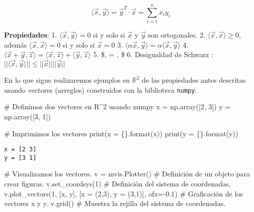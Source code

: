 \documentclass[
  letterpaper,
  DIV=11,
  numbers=noendperiod]{scrreprt}
\newenvironment{Shaded}{\begin{snugshade}}{\end{snugshade}}
\newcommand{\BuiltInTok}[1]{\textcolor[rgb]{0.00,0.23,0.31}{#1}}
\newcommand{\CommentTok}[1]{\textcolor[rgb]{0.37,0.37,0.37}{#1}}
\newcommand{\DecValTok}[1]{\textcolor[rgb]{0.68,0.00,0.00}{#1}}
\newcommand{\FloatTok}[1]{\textcolor[rgb]{0.68,0.00,0.00}{#1}}
\newcommand{\NormalTok}[1]{\textcolor[rgb]{0.00,0.23,0.31}{#1}}
\newcommand{\OperatorTok}[1]{\textcolor[rgb]{0.37,0.37,0.37}{#1}}
\newcommand{\SpecialCharTok}[1]{\textcolor[rgb]{0.37,0.37,0.37}{#1}}
\newcommand{\StringTok}[1]{\textcolor[rgb]{0.13,0.47,0.30}{#1}}
\begin{document}
\[
\langle \vec{x}, \vec{y} \rangle = \vec{y}^T \cdot \vec{x} = \sum_{i=1}^n x_i y_i \tag{1}
\]

\textbf{Propiedades}: 1. \(\langle \vec{x}, \vec{y} \rangle = 0\) si y
solo si \(\vec{x}\) y \(\vec{y}\) son ortogonales. 2.
\(\langle \vec{x}, \vec{x} \rangle \ge 0\), además
\(\langle \vec{x}, \vec{x} \rangle = 0\) si y solo si \(\vec{x} = 0\) 3.
\(\langle \alpha \vec{x}, \vec{y} \rangle = \alpha \langle \vec{x}, \vec{y} \rangle\)
4.
\(\langle \vec{x}+\vec{y}, \vec{z} \rangle = \langle \vec{x}, \vec{z} \rangle + \langle \vec{y}, \vec{z} \rangle\)
5. \$\langle {},  \rangle = \langle {}, 
\rangle \$ 6. Desigualdad de Schwarz :
\(||\langle \vec{x}, \vec{y} \rangle|| \le ||\vec{x}|| ||\vec{y}||\)

En lo que sigue realizaremos ejemplos en \(\mathbb{R}^2\) de las
propiedades antes descritas usando vectores (arreglos) construidos con
la biblioteca \texttt{numpy}.

\begin{Shaded}
\begin{Highlighting}[]
\CommentTok{\# Definimos dos vectores en R\^{}2 usando numpy}
\NormalTok{x }\OperatorTok{=}\NormalTok{ np.array([}\DecValTok{2}\NormalTok{, }\DecValTok{3}\NormalTok{]) }
\NormalTok{y }\OperatorTok{=}\NormalTok{ np.array([}\DecValTok{3}\NormalTok{, }\DecValTok{1}\NormalTok{])}

\CommentTok{\# Imprimimos los vectores}
\BuiltInTok{print}\NormalTok{(}\StringTok{\textquotesingle{}x = }\SpecialCharTok{\{\}}\StringTok{\textquotesingle{}}\NormalTok{.}\BuiltInTok{format}\NormalTok{(x))}
\BuiltInTok{print}\NormalTok{(}\StringTok{\textquotesingle{}y = }\SpecialCharTok{\{\}}\StringTok{\textquotesingle{}}\NormalTok{.}\BuiltInTok{format}\NormalTok{(y))}
\end{Highlighting}
\end{Shaded}

\begin{verbatim}
x = [2 3]
y = [3 1]
\end{verbatim}

\begin{Shaded}
\begin{Highlighting}[]
\CommentTok{\# Visualizamos los vectores.}
\NormalTok{v }\OperatorTok{=}\NormalTok{ mvis.Plotter()  }\CommentTok{\# Definición de un objeto para crear figuras.}
\NormalTok{v.set\_coordsys(}\DecValTok{1}\NormalTok{)   }\CommentTok{\# Definición del sistema de coordenadas.}
\NormalTok{v.plot\_vectors(}\DecValTok{1}\NormalTok{, [x, y], [}\StringTok{\textquotesingle{}x = (2,3)\textquotesingle{}}\NormalTok{, }\StringTok{\textquotesingle{}y = (3,1)\textquotesingle{}}\NormalTok{], ofx}\OperatorTok{={-}}\FloatTok{0.1}\NormalTok{) }\CommentTok{\# Graficación de los vectores \textquotesingle{}x\textquotesingle{} y \textquotesingle{}y\textquotesingle{}.}
\NormalTok{v.grid()  }\CommentTok{\# Muestra la rejilla del sistema de coordenadas.}
\end{Highlighting}
\end{Shaded}
\end{document}
